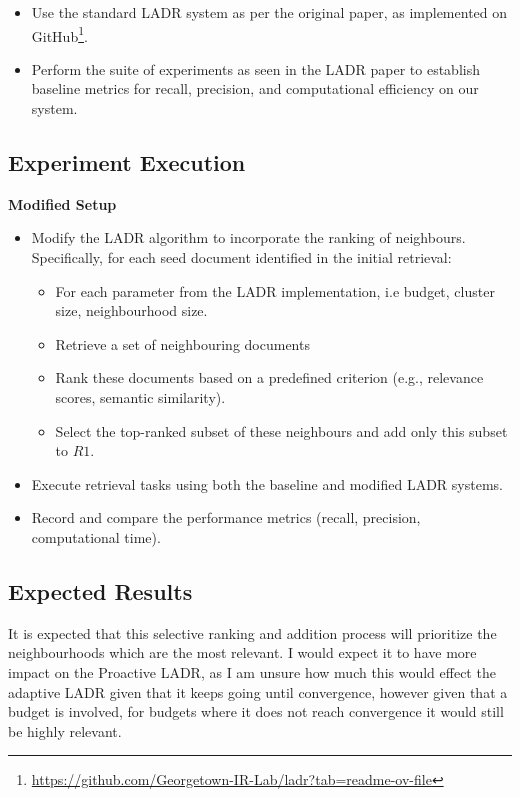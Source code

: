 \documentclass[sigconf,authorversion,nonacm]{acmart}
\begin{document}
\begin{itemize}

	\item Use the standard LADR system as per the original paper, as implemented
	      on GitHub\footnote{\url{https://github.com/Georgetown-IR-Lab/ladr?tab=readme-ov-file}}.

	\item Perform the suite of experiments as seen in the LADR paper to establish baseline metrics
	      for recall, precision, and computational efficiency on our system.

\end{itemize}

\subsection{Experiment Execution}
\textbf{Modified Setup}
\begin{itemize}
	\item Modify the LADR algorithm to incorporate the ranking of neighbours. Specifically, for each seed document identified in the initial retrieval:
	      \begin{itemize}
		      \item For each parameter from the LADR implementation, i.e budget, cluster size,
		            neighbourhood size.
		      \item Retrieve a set of neighbouring documents
		      \item Rank these documents based on a predefined criterion (e.g., relevance scores, semantic similarity).
		      \item Select the top-ranked subset of these neighbours and add only this subset to \( R1 \).
	      \end{itemize}
\end{itemize}

\begin{itemize}
	\item Execute retrieval tasks using both the baseline and modified LADR systems.
	\item Record and compare the performance metrics (recall, precision, computational time).
\end{itemize}

\subsection{Expected Results}

It is expected that this selective ranking and addition process will prioritize the neighbourhoods
which are the most relevant. I would expect it to have more impact on the Proactive LADR, as I am
unsure how much this would effect the adaptive LADR given that it keeps going until convergence,
however given that a budget is involved, for budgets where it does not reach convergence it would
still be highly relevant.
\end{document}
